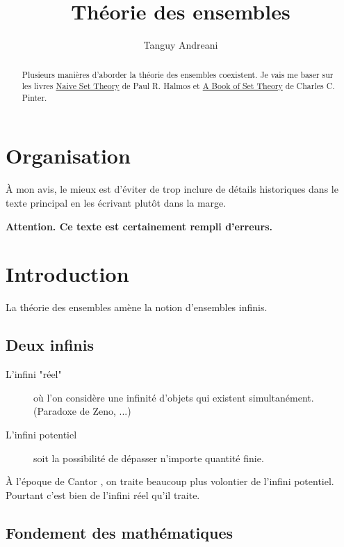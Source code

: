 \documentclass[fleqn,a4paper,nobib]{tufte-handout}
\title{Théorie des ensembles}
\author{Tanguy Andreani}
\begin{document}
\maketitle

\begin{abstract}
    Plusieurs manières d'aborder la théorie des ensembles 
    coexistent. Je vais me baser sur les livres \underline{Naive
    Set Theory} de Paul R. Halmos et \underline{A Book of Set
    Theory} de Charles C. Pinter.
\end{abstract}

\tableofcontents

\section*{Organisation}

À mon avis, le mieux est d'éviter de trop inclure de
détails historiques dans le texte principal en les écrivant
plutôt dans la marge.

\textbf{Attention. Ce texte est certainement rempli d'erreurs.}

\section{Introduction}

La théorie des ensembles amène la notion d'ensembles infinis.

\subsection{Deux infinis}

\begin{description}
    \item[L'infini "réel"] où l'on considère une infinité
    d'objets qui existent simultanément. (Paradoxe de Zeno,
    ...)
    \item[L'infini potentiel] soit la possibilité de
    dépasser n'importe quantité finie.
\end{description}

À l'époque de Cantor
,
on traite beaucoup plus volontier de l'infini potentiel.
Pourtant c'est bien de l'infini réel qu'il traite.

\subsection{Fondement des mathématiques}
\end{document}
